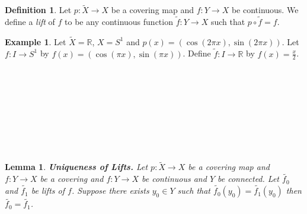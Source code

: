 \documentclass[11pt,reqno]{article}
\newcommand{\R}{\mathbb{R}}
\newtheorem{Lemma}{Lemma}
\theoremstyle{definition}
\newtheorem*{Definition}{Definition}
\newtheorem*{Example}{Example}
\begin{document}
\begin{Definition}
Let $p:\widetilde{X}\rightarrow X$ be a covering map and $f:Y\rightarrow X$ be continuous. We define a \textit{lift} of $f$ to be any continuous function $\widetilde{f}:Y\rightarrow X$ such that $p\circ \widetilde{f}=f$.
\end{Definition}

\begin{Example}
Let $\widetilde{X}=\R$, $X=S^1$ and $p(x)=\left(\cos(2\pi x),\sin(2\pi x)\right)$. Let $f:I\rightarrow S^1$ by $f(x)=\left(\cos(\pi x),\sin(\pi x)\right)$. Define $\widetilde{f}:I\rightarrow \R$ by $f(x)=\frac{x}{2}$.
\\\\\\\\\\\\\\\\\\
\end{Example}
\begin{Lemma}
\textbf{Uniqueness of Lifts.} Let $p:\widetilde{X}\rightarrow X$ be a covering map and $f:Y\rightarrow X$ be a covering and $f:Y\rightarrow X$ be continuous and $Y$ be connected. Let $\widetilde{f_0}$ and $\widetilde{f_1}$ be lifts of $f$. Suppose there exists $y_0\in Y$ such that $\widetilde{f_0}(y_0)=\widetilde{f_1}(y_0)$ then $\widetilde{f_0}=\widetilde{f_1}$.
\end{Lemma}
\end{document}
